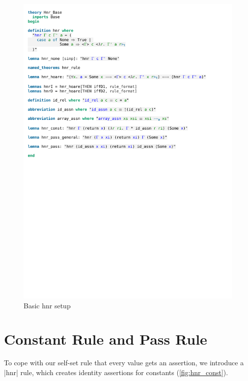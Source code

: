 \begin{figure}[htpb]
    \includegraphics[trim={0 17,8cm 0 6,2cm}, clip, width=1.00\textwidth]{figures/Theory_Hnr_Base.pdf}
    \caption[Basic hnr setup]{Basic hnr setup}
    \label{fig:hnr_base}
\end{figure}

\section{Constant Rule and Pass Rule}\label{section:hnr_const_pass}

To cope with our self-set rule that every value gets an assertion, we introduce a |hnr| rule, which creates identity assertions for constants (\autoref{fig:hnr_const}).

